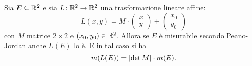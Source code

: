 \begin{theorem}
\label{th:area_lineare}%
%
%
Sia $E\subseteq {\mathbb R}^2$ e sia $L\colon {\mathbb R}^2\to{\mathbb R}^2$ una trasformazione
lineare affine:
\[
  L(x,y) = M\cdot \begin{pmatrix}x \\ y\end{pmatrix}
  + \begin{pmatrix}x_0 \\ y_0\end{pmatrix}
\]
con $M$ matrice $2\times 2$ e $(x_0 ,y_0)\in {\mathbb R}^2$.
Allora se $E$ è misurabile secondo Peano-Jordan anche $L(E)$ lo è.
E in tal caso si ha
\begin{equation}\label{eq:formula_area}
  m(L(E)) = {\left|\det M\right|} \cdot m(E).
\end{equation}
\end{theorem}
%
